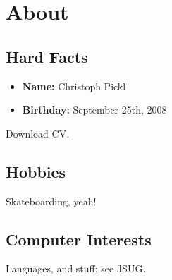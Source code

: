 
\section{About}

\subsection{Hard Facts}

\begin{itemize}
  \item \textbf{Name:} Christoph Pickl
  \item \textbf{Birthday:} September 25th, 2008 
\end{itemize}

Download CV.

\subsection{Hobbies}

Skateboarding, yeah!

\subsection{Computer Interests}

Languages, and stuff; see JSUG.



%
